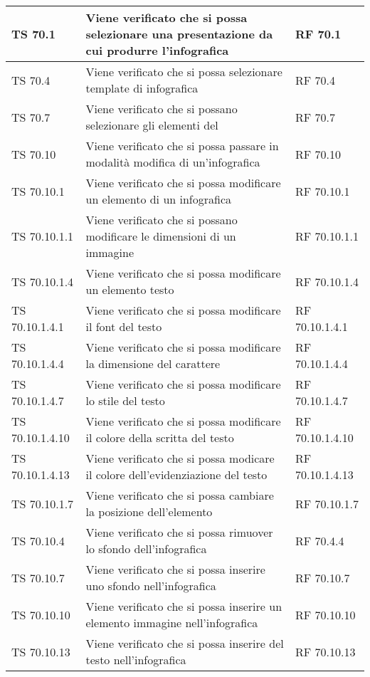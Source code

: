 {{\begin{longtable} [c]{| p{3cm} | p{6cm} |p{3cm}|}
			\hline
			TS 70.1 & Viene verificato che si possa selezionare una presentazione da cui produrre l'infografica  & RF 70.1\\
			\hline
			TS 70.4 & Viene verificato che si possa selezionare template di infografica & RF 70.4\\
			\hline
			TS 70.7 & Viene verificato che si possano selezionare gli elementi del  & RF 70.7\\
			\hline
			TS 70.10 & Viene verificato che si possa passare in modalità modifica di un'infografica & RF 70.10\\
			\hline
			TS 70.10.1 & Viene verificato che si possa modificare un elemento di un infografica & RF 70.10.1\\
			\hline
			TS 70.10.1.1 & Viene verificato che si possano modificare le dimensioni di un immagine & RF 70.10.1.1\\
			\hline
			TS 70.10.1.4 & Viene verificato che si possa modificare un elemento testo  & RF 70.10.1.4\\
			\hline
			TS 70.10.1.4.1 & Viene verificato che si possa modificare il font del testo & RF 70.10.1.4.1\\
			\hline
			TS 70.10.1.4.4 & Viene verificato che si possa modificare la dimensione del carattere & RF 70.10.1.4.4\\
			\hline
			TS 70.10.1.4.7 & Viene verificato che si possa modificare lo stile del testo & RF 70.10.1.4.7\\
			\hline
			TS 70.10.1.4.10 & Viene verificato che si possa modificare il colore della scritta del testo & RF 70.10.1.4.10\\
			\hline
			TS 70.10.1.4.13 & Viene verificato che si possa modicare il colore dell'evidenziazione del testo & RF 70.10.1.4.13\\
			\hline
			TS 70.10.1.7 & Viene verificato che si possa cambiare la posizione dell'elemento & RF 70.10.1.7\\
			\hline
			TS 70.10.4 & Viene verificato che si possa rimuover lo sfondo dell'infografica & RF 70.4.4\\
			\hline
			TS 70.10.7 & Viene verificato che si possa inserire uno sfondo nell'infografica & RF 70.10.7\\
			\hline
			TS 70.10.10 & Viene verificato che si possa inserire un elemento immagine nell'infografica & RF 70.10.10\\
			\hline
			TS 70.10.13 & Viene verificato che si possa inserire del testo nell'infografica & RF 70.10.13\\
			\hline

\end{longtable}}}
